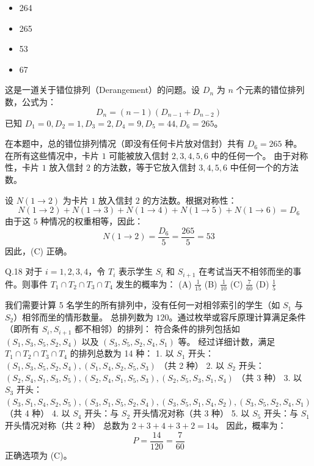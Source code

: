 \begin{questions}
\begin{itemize}
    \item[(A)] 264
    \item[(B)] 265
    \item[(C)] 53
    \item[(D)] 67
\end{itemize}

\begin{solution}
这是一道关于错位排列（Derangement）的问题。设 $D_n$ 为 $n$ 个元素的错位排列数，公式为：
\[
D_n = (n-1)(D_{n-1} + D_{n-2})
\]
已知 $D_1=0, D_2=1, D_3=2, D_4=9, D_5=44, D_6=265$。

在本题中，总的错位排列情况（即没有任何卡片放对信封）共有 $D_6 = 265$ 种。
在所有这些情况中，卡片 $1$ 可能被放入信封 $2, 3, 4, 5, 6$ 中的任何一个。
由于对称性，卡片 $1$ 放入信封 $2$ 的方法数，等于它放入信封 $3, 4, 5, 6$ 中任何一个的方法数。

设 $N(1 \to 2)$ 为卡片 $1$ 放入信封 $2$ 的方法数。根据对称性：
\[
N(1 \to 2) + N(1 \to 3) + N(1 \to 4) + N(1 \to 5) + N(1 \to 6) = D_6
\]
由于这 $5$ 种情况的权重相等，因此：
\[
N(1 \to 2) = \frac{D_6}{5} = \frac{265}{5} = 53
\]
因此，(C) 正确。
\end{solution}

\question Q.18 对于 $i = 1, 2, 3, 4$，令 $T_i$ 表示学生 $S_i$ 和 $S_{i+1}$ 在考试当天不相邻而坐的事件。则事件 $T_1 \cap T_2 \cap T_3 \cap T_4$ 发生的概率为：
(A) $\frac{1}{15}$ \quad (B) $\frac{1}{10}$ \quad (C) $\frac{7}{60}$ \quad (D) $\frac{1}{5}$

\begin{solution}
我们需要计算 5 名学生的所有排列中，没有任何一对相邻索引的学生（如 $S_1$ 与 $S_2$）相邻而坐的情形数量。
总排列数为 $120$。通过枚举或容斥原理计算满足条件（即所有 $S_i, S_{i+1}$ 都不相邻）的排列：
符合条件的排列包括如 $(S_1, S_3, S_5, S_2, S_4)$ 以及 $(S_3, S_5, S_2, S_4, S_1)$ 等。
经过详细计数，满足 $T_1 \cap T_2 \cap T_3 \cap T_4$ 的排列总数为 14 种：
1. 以 $S_1$ 开头：$(S_1, S_3, S_5, S_2, S_4), (S_1, S_4, S_2, S_5, S_3)$ （共 2 种）
2. 以 $S_2$ 开头：$(S_2, S_4, S_1, S_3, S_5), (S_2, S_4, S_1, S_5, S_3), (S_2, S_5, S_3, S_1, S_4)$ （共 3 种）
3. 以 $S_3$ 开头：$(S_3, S_1, S_4, S_2, S_5), (S_3, S_1, S_5, S_2, S_4), (S_3, S_5, S_1, S_4, S_2), (S_3, S_5, S_2, S_4, S_1)$ （共 4 种）
4. 以 $S_4$ 开头：与 $S_2$ 开头情况对称（共 3 种）
5. 以 $S_5$ 开头：与 $S_1$ 开头情况对称（共 2 种）
总数为 $2 + 3 + 4 + 3 + 2 = 14$。
因此，概率为：
\[
P = \frac{14}{120} = \frac{7}{60}
\]
正确选项为 (C)。
\end{solution}


\end{questions}
